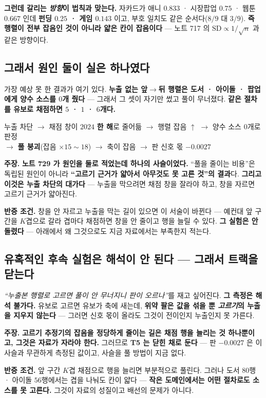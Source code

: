 \documentclass[10pt,a4paper]{article}
\newcommand{\claim}[2]{\begin{claimbox}\textbf{주장.} #1\par\smallskip
  \textcolor{gray!70}{\textbf{반증 조건.} #2}\end{claimbox}}
\begin{document}
\textbf{그런데 갈리는 \emph{방향}이 법칙과 맞는다.} 자카드가 애니 $0.833$ · 시장팝업
$0.75$ · 웹툰 $0.667$ 인데 \textbf{펀딩 $0.25$ · 게임 $0.143$} 이고, 부호 일치도 같은
순서다($8/9$ 대 $3/9$). \textbf{즉 행렬이 전부 잡음인 것이 아니라 얇은 칸이
잡음이다} --- 노트 717 의 $\text{SD} \propto 1/\sqrt{n}$ 과 같은 방향이다.

\subsection*{그래서 원인 둘이 실은 하나였다}

가장 예상 못 한 결과가 여기 있다. \textbf{누출 없는 앞$\to$뒤 행렬은 도서 · 아이돌 ·
팝업에게 양수 소스를 $0$개 줬다} --- 그래서 그 셋이 자기만 썼고 풀이 무너졌다.
\textbf{같은 절차를 유보로 채점하면 $5$ · $1$ · $6$개다.}

\begin{center}
누출 차단 $\to$ 채점 창이 $2024$ \textbf{한 해}로 줄어듦 $\to$ 행렬 잡음 $\uparrow$
$\to$ 양수 소스 $0$개로 판정 \\
$\to$ \textbf{풀 붕괴}(잡음 $\times 15 \sim 18$) $\to$ 축이 잡음 $\to$
판 신호 몫 $\mathbf{-0.0027}$
\end{center}

\claim{\textbf{노트 729 가 원인을 둘로 적었는데 하나의 사슬이었다.} ``풀을 줄이는
비용''은 독립된 원인이 아니라 \textbf{``고르기 근거가 얇아서 아무것도 못 고른
것''의 결과}다. \textbf{그리고 이것은 누출 차단의 대가다} --- 누출을 막으려면 채점
창을 잘라야 하고, 창을 자르면 고르기 근거가 얇아진다.}
{창을 안 자르고 누출을 막는 길이 있으면 이 서술이 바뀐다 --- 예컨대 앞 구간을
$K$겹으로 갈라 겹마다 채점하면 창을 안 줄이고 행을 늘릴 수 있다. \textbf{그
실험은 안 돌렸다} --- 아래에서 왜 그것으로도 지금 자료에서는 부족한지 적는다.}

\subsection*{유혹적인 후속 실험은 해석이 안 된다 --- 그래서 트랙을 닫는다}

\emph{``누출본 행렬로 고르면 풀이 안 무너지니 판이 오르나''}를 재고 싶어진다.
\textbf{그 측정은 해석 불가다.} 유보로 고르면 유보가 축에 새는데, \textbf{위약 팔은
값을 섞을 뿐 \emph{고르기}의 누출을 지우지 않는다} --- 그러면 신호 몫이 올라도 그것이
전이인지 누출인지 못 가른다.

\claim{\textbf{고르기 추정기의 잡음을 정당하게 줄이는 길은 채점 행을 늘리는 것
하나뿐이고, 그것은 자료가 자라야 한다.} 그러므로 \textbf{T5 는 닫힌 채로 둔다} ---
판 $-0.0027$ 은 이 사슬과 무관하게 측정된 값이고, 사슬을 풀 방법이 지금 없다.}
{앞 구간 $K$겹 채점으로 행을 늘리면 부분적으로 풀린다. 그러나 도서 $80$행 · 아이돌
$56$행에서는 겹을 나눠도 칸이 얇다 --- \textbf{작은 도메인에서는 어떤 절차로도 소스를
못 고른다.} 그것이 자료의 성질이고 배선의 문제가 아니다.}
\end{document}
